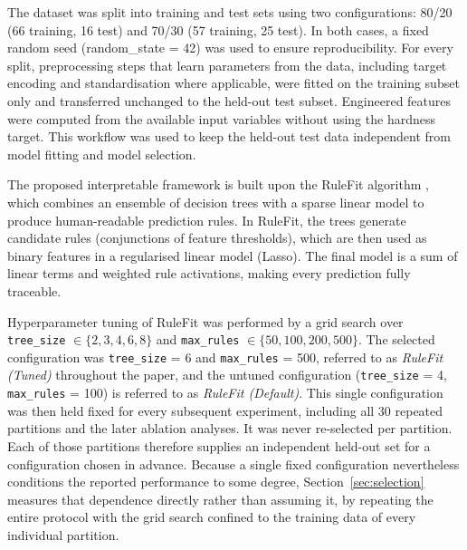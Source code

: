 \documentclass[pdflatex,sn-mathphys-num]{sn-jnl}%
\newif\ifrevmarks%
\newcommand{\revmark}[1]{\ifrevmarks\textcolor{revblue}{#1}\else#1\fi}%
\theoremstyle{thmstyleone}%
\theoremstyle{thmstyletwo}%
\theoremstyle{thmstylethree}%
\begin{document}
The dataset was split into training and test sets using two configurations: 80/20 (66 training, 16 test) and 70/30 (57 training, 25 test). In both cases, a fixed random seed (random\_state = 42) was used to ensure reproducibility. For every split, preprocessing steps that learn parameters from the data, including target encoding and standardisation where applicable, were fitted on the training subset only and transferred unchanged to the held-out test subset. Engineered features were computed from the available input variables without using the hardness target. This workflow was used to keep the held-out test data independent from model fitting and model selection.

\revmark{The proposed interpretable framework is built upon the RuleFit algorithm \cite{friedman2008predictive}, which combines an ensemble of decision trees with a sparse linear model to produce human-readable prediction rules. In RuleFit, the trees generate candidate rules (conjunctions of feature thresholds), which are then used as binary features in a regularised linear model (Lasso). The final model is a sum of linear terms and weighted rule activations, making every prediction fully traceable.}

\revmark{Hyperparameter tuning of RuleFit was performed by a grid search over \texttt{tree\_size} $\in \{2, 3, 4, 6, 8\}$ and \texttt{max\_rules} $\in \{50, 100, 200, 500\}$. The selected configuration was \texttt{tree\_size} = 6 and \texttt{max\_rules} = 500, referred to as \textit{RuleFit (Tuned)} throughout the paper, and the untuned configuration (\texttt{tree\_size} = 4, \texttt{max\_rules} = 100) is referred to as \textit{RuleFit (Default)}. This single configuration was then held fixed for every subsequent experiment, including all 30 repeated partitions and the later ablation analyses. It was never re-selected per partition. Each of those partitions therefore supplies an independent held-out set for a configuration chosen in advance. Because a single fixed configuration nevertheless conditions the reported performance to some degree, Section~\ref{sec:selection} measures that dependence directly rather than assuming it, by repeating the entire protocol with the grid search confined to the training data of every individual partition.}
\end{document}
